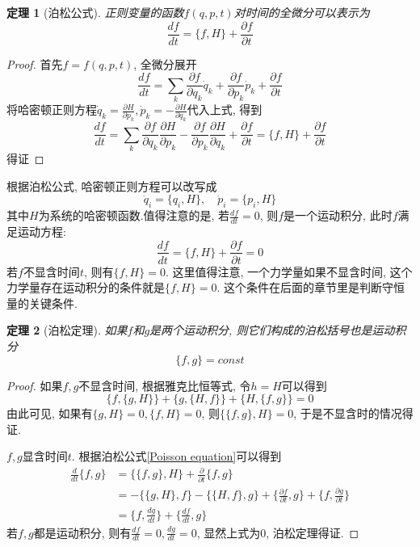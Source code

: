 \documentclass[a4paper,11pt]{article}
\newtheorem{theorem}{\hspace{2em}定理}[section]
\newtheorem{proof}{证明}[section]
\begin{document}
\begin{theorem}[泊松公式]
正则变量的函数$f(q,p,t)$对时间的全微分可以表示为
  \begin{equation}\label{Poisson equation}
  \frac{df}{dt}=\{f,H\}+\frac{\partial f}{\partial t}
  \end{equation}
\end{theorem}
\begin{proof}
  首先$f=f(q,p,t)$, 全微分展开
\begin{equation*}
  \frac{df}{dt}=\sum_{k}\frac{\partial f}{\partial{q_k}}\dot{q}_k+\frac{\partial f}{\partial{p_k}}\dot{p}_k+\frac{\partial f}{\partial t}
\end{equation*}
将哈密顿正则方程$\dot{q}_k=\frac{\partial H}{\partial{p_k}},\dot{p}_k=-\frac{\partial H}{\partial{q_k}}$代入上式, 得到
\begin{equation*}
  \frac{df}{dt}=\sum_{k}\frac{\partial f}{\partial{q_k}}\frac{\partial H}{\partial{p_k}}-\frac{\partial f}{\partial{p_k}}\frac{\partial H}{\partial{q_k}}+\frac{\partial f}{\partial t}=\{f,H\}+\frac{\partial f}{\partial t}
\end{equation*}
得证
\end{proof}
根据泊松公式, 哈密顿正则方程可以改写成
\begin{equation*}
  \dot{q}_i=\{q_i,H\},\quad \dot{p}_i=\{p_i,H\}
\end{equation*}
其中$H$为系统的哈密顿函数.值得注意的是, 若$\frac{df}{dt}=0$, 则$f$是一个运动积分, 此时$f$满足运动方程:
\begin{equation*}
  \frac{df}{dt}=\{f,H\}+\frac{\partial f}{\partial t}=0
\end{equation*}
若$f$不显含时间$t$, 则有$\{f,H\}=0$. 这里值得注意, 一个力学量如果不显含时间, 这个力学量存在运动积分的条件就是$\{f,H\}=0$. 这个条件在后面的章节里是判断守恒量的关键条件.
\begin{theorem}[泊松定理]
  如果$f$和$g$是两个运动积分, 则它们构成的泊松括号也是运动积分
  \begin{equation*}
    \{f,g\}=const
  \end{equation*}
\end{theorem}
\begin{proof}
  如果$f,g$不显含时间, 根据雅克比恒等式, 令$h=H$可以得到
\begin{equation*}
  \{f,\{g,H\}\}+\{g,\{H,f\}\}+\{H,\{f,g\}\}=0
\end{equation*}
由此可见, 如果有$\{g,H\}=0,\{f,H\}=0$, 则$\{\{f,g\},H\}=0$, 于是不显含时的情况得证.

$f,g$显含时间$t$. 根据泊松公式\eqref{Poisson equation}可以得到
\begin{equation*}
\begin{split}
   \frac{d}{dt}\{f,g\}&=\{\{f,g\},H\}+\frac{\partial}{\partial t}\{f,g\} \\
     &=-\{\{g,H\},f\}-\{\{H,f\},g\}+\{\frac{\partial f}{\partial t},g\}+\{f,\frac{\partial g}{\partial t}\} \\
     &=\{f,\frac{dg}{dt}\}+\{\frac{df}{dt},g\}
\end{split}
\end{equation*}
若$f,g$都是运动积分, 则有$\frac{df}{dt}=0,\frac{dg}{dt}=0$, 显然上式为0, 泊松定理得证.
\end{proof}
\end{document}
